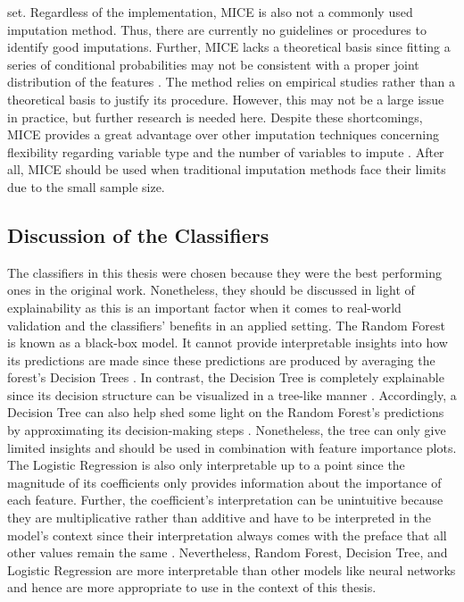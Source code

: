 set.
Regardless of the implementation, MICE is also not a commonly used imputation 
method. Thus, there are currently no guidelines or procedures to identify 
good imputations. Further, MICE lacks a theoretical basis since fitting a 
series of conditional probabilities may not be consistent with a proper joint 
distribution of the features \cite{RN141}. The method relies on empirical 
studies rather than a 
theoretical basis to justify its procedure. However, this may not be a large 
issue in practice, but further research is needed here. Despite these 
shortcomings, MICE 
provides a great advantage over other imputation techniques concerning 
flexibility regarding variable type and the number of variables to impute 
\cite{RN141, RN142}. After all, MICE should be used when traditional 
imputation methods face their limits due to the small sample size.
\subsection{Discussion of the Classifiers}
\label{sec:classifiers}
The classifiers in this thesis were chosen because they were the best performing 
ones in the original work. Nonetheless, they should be discussed in light of 
explainability as this is an important factor when it comes to real-world 
validation and the classifiers' benefits in an applied setting.
The Random Forest is known as a black-box model. It cannot provide 
interpretable insights into how its predictions are made since these 
predictions are produced by averaging the forest’s Decision Trees \cite{RN163}. 
In contrast, the Decision Tree is completely explainable since its decision 
structure can be visualized in a tree-like manner \cite{RN171}. Accordingly, a 
Decision Tree can also help shed some light on the Random Forest’s predictions 
by approximating its decision-making steps \cite{RN210}. Nonetheless, the tree 
can only give limited insights and should be used in combination with feature 
importance plots. The Logistic Regression is also only interpretable up to a 
point since the magnitude of its coefficients only provides information about 
the importance of each feature. Further, the coefficient's interpretation can be 
unintuitive because they are multiplicative rather than additive and have to be 
interpreted in the model's context since their interpretation always comes with 
the preface that all other values remain the same \cite{RN174}. Nevertheless, 
Random Forest, Decision Tree, and Logistic 
Regression are more interpretable than other models like neural networks and 
hence are more appropriate to use in the context of this thesis.
